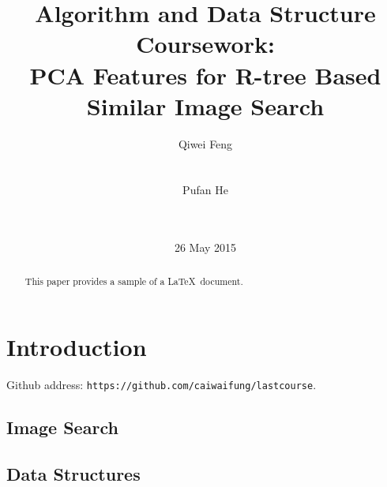 \documentclass{acm_proc_article-sp}
\begin{document}
\title{Algorithm and Data Structure Coursework: \\PCA Features for
R-tree Based Similar Image Search}
\subtitle{}
%
%
\author{
%
%
\alignauthor
Qiwei Feng\\
       \\
       \\
\alignauthor
Pufan He\\
       \\
       \\
}
\date{26 May 2015}

\maketitle
\begin{abstract}
This paper provides a sample of a \LaTeX\ document.
\end{abstract}


\section{Introduction}

Github address: \texttt{https://github.com/caiwaifung/lastcourse}.

\subsection{Image Search}

\subsection{Data Structures}
\end{document}
